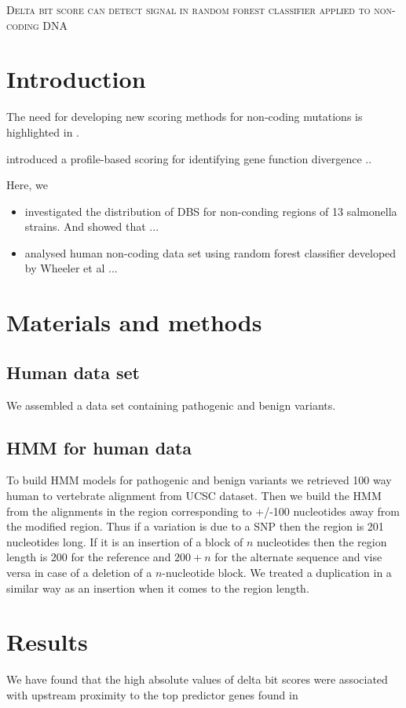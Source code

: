 \documentclass[12pt,article]{article}
\begin{document}
\begin{center}
\Large{\scshape Delta bit score can detect signal in random forest classifier applied to non-coding DNA} 
\end{center}

\section{Introduction}

The need for developing new scoring methods for non-coding mutations is highlighted in \citet{drubay2018benchmark}.

\citet{wheeler2016profile} introduced a profile-based scoring for identifying gene function divergence .. 

Here, we 

\begin{itemize}

\item investigated the distribution of DBS for non-conding regions of 13 salmonella strains. And showed that ...

\item analysed human non-coding data set using random forest classifier developed by Wheeler et al ...

\end{itemize}

\section{Materials and methods}

\subsection{Human data set}

We assembled a data set containing pathogenic and benign variants. 

\subsection{HMM for human data}

To build HMM models for pathogenic and benign variants we retrieved 100 way human to vertebrate alignment from UCSC dataset. Then we build the HMM from the alignments in the region corresponding to +/-100 nucleotides away from the modified region. Thus if a variation is due to a SNP then the region is 201 nucleotides long. If it is an insertion of a block of $n$ nucleotides then the region length is 200 for the reference and $200+n$ for the alternate sequence and vise versa in case of a deletion of a $n$-nucleotide block. We treated a duplication in a similar way as an insertion when it comes to the region length. 

\section{Results}

We have found that the high absolute values of delta bit scores were associated with upstream proximity to the top predictor genes found in \citet{wheeler2018machine}

 

\end{document}
